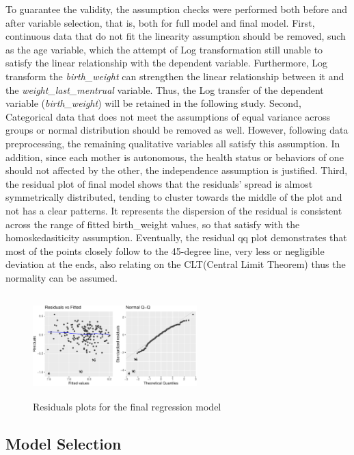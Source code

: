 \documentclass[9pt,twocolumn,twoside,]{pnas-new}
\begin{document}
To guarantee the validity, the assumption checks were performed both
before and after variable selection, that is, both for full model and
final model. First, continuous data that do not fit the linearity
assumption should be removed, such as the age variable, which the
attempt of Log transformation still unable to satisfy the linear
relationship with the dependent variable. Furthermore, Log transform the
\emph{birth\_weight} can strengthen the linear relationship between it
and the \emph{weight\_last\_mentrual} variable. Thus, the Log transfer
of the dependent variable (\emph{birth\_weight}) will be retained in the
following study. Second, Categorical data that does not meet the
assumptions of equal variance across groups or normal distribution
should be removed as well. However, following data preprocessing, the
remaining qualitative variables all satisfy this assumption. In
addition, since each mother is autonomous, the health status or
behaviors of one should not affected by the other, the independence
assumption is justified. Third, the residual plot of final model shows
that the residuals' spread is almost symmetrically distributed, tending
to cluster towards the middle of the plot and not has a clear patterns.
It represents the dispersion of the residual is consistent across the
range of fitted birth\_weight values, so that satisfy with the
homoskedasiticity assumption. Eventually, the residual qq plot
demonstrates that most of the points closely follow to the 45-degree
line, very less or negligible deviation at the ends, also relating on
the CLT(Central Limit Theorem) thus the normality can be assumed.

\begin{figure}[h]
\centering

\includegraphics[width=240px,height=150px]{report_files/figure-latex/unnamed-chunk-1-1} 
\caption{Residuals plots for the final regression model}
\end{figure}

\hypertarget{model-selection}{%
\subsection*{Model Selection}\label{model-selection}}
\end{document}
